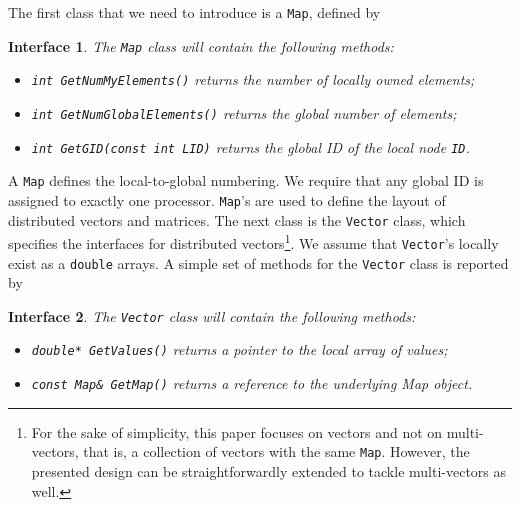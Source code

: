 \documentclass[acmtocl]{acmtrans2m}
\newtheorem{interface}{Interface}[section]
\begin{document}
\smallskip

The first class that we need to introduce is a {\tt Map}, defined by
\begin{interface}
\label{int:map}
The {\tt Map} class will contain the following methods:

\begin{itemize}
\item {\tt int GetNumMyElements()} returns the number of locally owned elements;
\item {\tt int GetNumGlobalElements()} returns the global number of elements;
\item {\tt int GetGID(const int LID)} returns the global ID of the local node {\tt ID}.
\end{itemize}
\end{interface}
A {\tt Map} defines the local-to-global numbering. We require that any global
ID is assigned to exactly one processor. {\tt Map}'s are used to define the
layout of distributed vectors and matrices. The next class is the {\tt Vector}
class, which specifies the interfaces for
distributed vectors\footnote{
For the sake of simplicity, this paper focuses on vectors and not on
multi-vectors, that is, a collection of vectors with the same {\tt Map}.
However, the presented design can be straightforwardly extended to tackle
multi-vectors as well.
}. We assume that {\tt Vector}'s  locally exist as a {\tt double} arrays.
A simple set of methods for the {\tt Vector} class is reported by 
\begin{interface}
\label{int:vector}
The {\tt Vector} class will contain the following methods:

\begin{itemize}
\item {\tt double* GetValues()} returns a pointer to the local array of values;
\item {\tt const Map\& GetMap()} returns a reference to the underlying Map object.
\end{itemize}
\end{interface}
\end{document}
